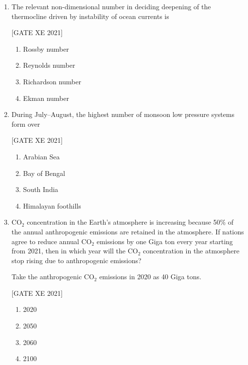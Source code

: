 \documentclass[journal,12pt,onecolumn]{IEEEtran}
\theoremstyle{remark}
\begin{document}
\begin{enumerate}[resume]
\item The relevant non-dimensional number in deciding deepening of the thermocline driven by instability of ocean currents is

\hfill[GATE XE 2021]

\begin{multicols}{2}
\begin{enumerate}
\item Rossby number
\item Reynolds number
\item Richardson number
\item Ekman number
\end{enumerate}
\end{multicols}


\item During July–August, the highest number of monsoon low pressure systems form over

\hfill[GATE XE 2021]

\begin{multicols}{2}
\begin{enumerate}
\item Arabian Sea
\item Bay of Bengal
\item South India
\item Himalayan foothills
\end{enumerate}
\end{multicols}


\item CO$_2$ concentration in the Earth’s atmosphere is increasing because 50\% of the annual anthropogenic emissions are retained in the atmosphere. If nations agree to reduce annual CO$_2$ emissions by one Giga ton every year starting from 2021, then in which year will the CO$_2$ concentration in the atmosphere stop rising due to anthropogenic emissions?  

Take the anthropogenic CO$_2$ emissions in 2020 as 40 Giga tons.

\hfill[GATE XE 2021]

\begin{multicols}{2}
\begin{enumerate}
\item 2020
\item 2050
\item 2060
\item 2100
\end{enumerate}
\end{multicols}



\end{enumerate}
\end{document}
